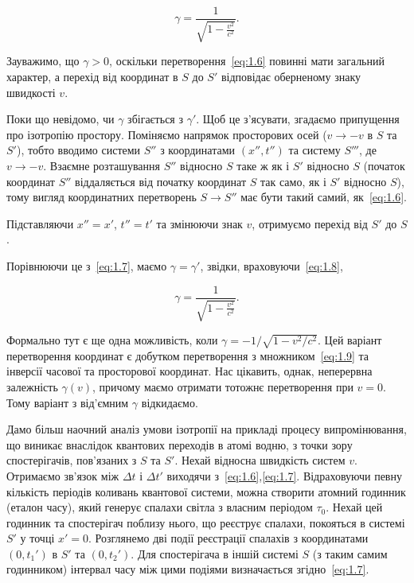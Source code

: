 \begin{equation}
\gamma = \frac{1}{\sqrt{1 - \frac{v^2}{c^2}}}.
\label{eq:1.8}
\end{equation}

Зауважимо, що $\gamma > 0$, оскільки перетворення~\eqref{eq:1.6} повинні мати загальний характер, а перехід від координат в $S$ до $S'$ відповідає оберненому знаку швидкості $v$.

Поки що невідомо, чи $\gamma$ збігається з $\gamma'$. Щоб це з’ясувати, згадаємо припущення про ізотропію простору. Поміняємо напрямок просторових осей ($v \to -v$ в $S$ та $S'$), тобто вводимо системи $S''$ з координатами $(x'', t'')$ та систему $S'''$, де $v \to -v$. Взаємне розташування $S''$ відносно $S$ таке ж як і $S'$ відносно $S$ (початок координат $S''$ віддаляється від початку координат $S$ так само, як і $S'$ відносно $S$), тому вигляд координатних перетворень $S \to S''$ має бути такий самий, як~\eqref{eq:1.6}.

Підставляючи $x'' = x'$, $t'' = t'$ та змінюючи знак $v$, отримуємо перехід від $S'$ до $S$.

Порівнюючи це з~\eqref{eq:1.7}, маємо $\gamma = \gamma'$, звідки, враховуючи~\eqref{eq:1.8},

\begin{equation}
\gamma = \frac{1}{\sqrt{1 - \frac{v^2}{c^2}}}.
\label{eq:1.9}
\end{equation}

Формально тут є ще одна можливість, коли $\gamma = -1/\sqrt{1 - v^2/c^2}$. Цей варіант перетворення координат є добутком перетворення з множником~\eqref{eq:1.9} та інверсії часової та просторової координат. Нас цікавить, однак, неперервна залежність $\gamma(v)$, причому маємо отримати тотожнє перетворення при $v=0$. Тому варіант з від'ємним $\gamma$ відкидаємо.

Дамо більш наочний аналіз умови ізотропії на прикладі процесу випромінювання, що виникає внаслідок квантових переходів в атомі водню, з точки зору спостерігачів, пов'язаних з $S$ та $S'$. Нехай відносна швидкість систем $v$. Отримаємо зв'язок між $\Delta t$ і $\Delta t'$ виходячи з~\eqref{eq:1.6},\eqref{eq:1.7}. Відраховуючи певну кількість періодів коливань квантової системи, можна створити атомний годинник (еталон часу), який генерує спалахи світла з власним періодом $\tau_0$. Нехай цей годинник та спостерігач поблизу нього, що реєструє спалахи, покояться в системі $S'$ у точці $x'=0$. Розглянемо дві події реєстрації спалахів з координатами $(0, t_1')$ в $S'$ та $(0, t_2')$. Для спостерігача в іншій системі $S$ (з таким самим годинником) інтервал часу між цими подіями визначається згідно~\eqref{eq:1.7}.

